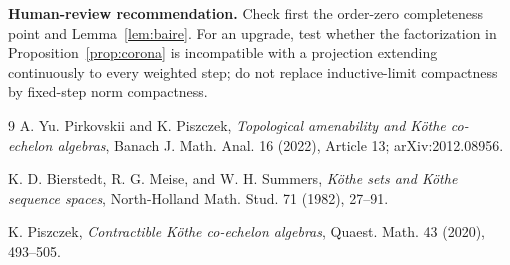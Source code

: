 \documentclass[10pt]{article}
\begin{document}
\textbf{Human-review recommendation.} Check first the order-zero completeness
point and Lemma~\ref{lem:baire}.  For an upgrade, test whether the factorization
in Proposition~\ref{prop:corona} is incompatible with a projection extending
continuously to every weighted step; do not replace inductive-limit compactness
by fixed-step norm compactness.

\begin{thebibliography}{9}
A. Yu. Pirkovskii and K. Piszczek,
\emph{Topological amenability and K\"othe co-echelon algebras},
Banach J. Math. Anal. 16 (2022), Article 13; arXiv:2012.08956.

K. D. Bierstedt, R. G. Meise, and W. H. Summers,
\emph{K\"othe sets and K\"othe sequence spaces},
North-Holland Math. Stud. 71 (1982), 27--91.

K. Piszczek,
\emph{Contractible K\"othe co-echelon algebras},
Quaest. Math. 43 (2020), 493--505.
\end{thebibliography}
\end{document}

